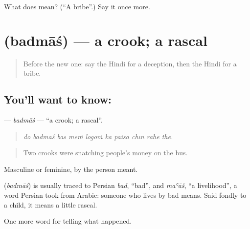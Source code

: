 \begin{tcolorbox}[breakable,colback=teal!4,colframe=teal!35!black,title={Before you move on}]
What does  mean? (\textquotedblleft{}A bribe\textquotedblright{}.) Say it once more.
\end{tcolorbox}
\section[\texorpdfstring{\hi{बदमाश} (badmāś)}{बदमाश (badmāś)}]{ (badmāś) — a crook; a rascal}

\label{lesson:HI-C293-badmas}



\begin{quote}
Before the new one: say the Hindi for a deception, then the Hindi for a bribe.
\end{quote}

\subsection*{You'll want to know: }
\textbf{} — \emph{badmāś} — \textquotedblleft{}a crook; a rascal\textquotedblright{}.

\begin{quote}
         
\end{quote}

\begin{quote}
\emph{do badmāś bas meṁ logoṁ kā paisā chīn rahe the.}
\end{quote}

\begin{quote}
Two crooks were snatching people's money on the bus.
\end{quote}

Masculine or feminine, by the person meant.

\begin{cousinweb}
\textbf{} (\emph{badmāś}) is usually traced to Persian \emph{bad}, \textquotedblleft{}bad\textquotedblright{}, and \emph{maʿāš}, \textquotedblleft{}a livelihood\textquotedblright{}, a word Persian took from Arabic: someone who lives by bad means. Said fondly to a child, it means a little rascal.
\end{cousinweb}

\begin{grammarlens}[title={What you've built}]
One more word for telling what happened.
\end{grammarlens}


